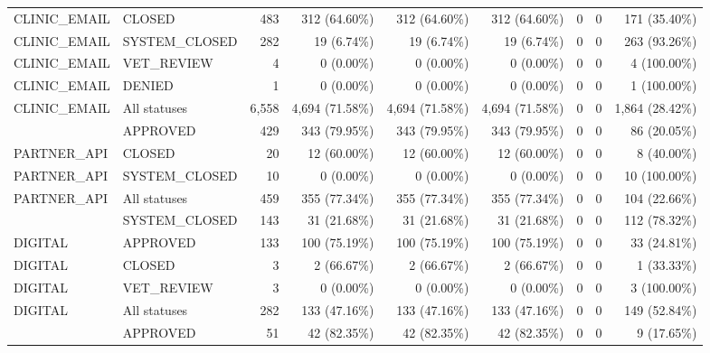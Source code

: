 \begin{longtable}{@{}llrrrrrrr@{}}
{CLINIC\_EMAIL} & {CLOSED} & 483 & 312 (64.60\%) & 312 (64.60\%) & 312 (64.60\%) & 0 & 0 & 171 (35.40\%) \\

{CLINIC\_EMAIL} & {SYSTEM\_CLOSED} & 282 & 19 (6.74\%) & 19 (6.74\%) & 19 (6.74\%) & 0 & 0 & 263 (93.26\%) \\

{CLINIC\_EMAIL} & {VET\_REVIEW} & 4 & 0 (0.00\%) & 0 (0.00\%) & 0 (0.00\%) & 0 & 0 & 4 (100.00\%) \\

{CLINIC\_EMAIL} & {DENIED} & 1 & 0 (0.00\%) & 0 (0.00\%) & 0 (0.00\%) & 0 & 0 & 1 (100.00\%) \\
\midrule
{CLINIC\_EMAIL} & {All statuses} & 6,558 & 4,694 (71.58\%) & 4,694 (71.58\%) & 4,694 (71.58\%) & 0 & 0 & 1,864 (28.42\%) \\
\addlinespace[2pt]
{PARTNER\_API} & {APPROVED} & 429 & 343 (79.95\%) & 343 (79.95\%) & 343 (79.95\%) & 0 & 0 & 86 (20.05\%) \\

{PARTNER\_API} & {CLOSED} & 20 & 12 (60.00\%) & 12 (60.00\%) & 12 (60.00\%) & 0 & 0 & 8 (40.00\%) \\

{PARTNER\_API} & {SYSTEM\_CLOSED} & 10 & 0 (0.00\%) & 0 (0.00\%) & 0 (0.00\%) & 0 & 0 & 10 (100.00\%) \\
\midrule
{PARTNER\_API} & {All statuses} & 459 & 355 (77.34\%) & 355 (77.34\%) & 355 (77.34\%) & 0 & 0 & 104 (22.66\%) \\
\addlinespace[2pt]
{DIGITAL} & {SYSTEM\_CLOSED} & 143 & 31 (21.68\%) & 31 (21.68\%) & 31 (21.68\%) & 0 & 0 & 112 (78.32\%) \\

{DIGITAL} & {APPROVED} & 133 & 100 (75.19\%) & 100 (75.19\%) & 100 (75.19\%) & 0 & 0 & 33 (24.81\%) \\

{DIGITAL} & {CLOSED} & 3 & 2 (66.67\%) & 2 (66.67\%) & 2 (66.67\%) & 0 & 0 & 1 (33.33\%) \\

{DIGITAL} & {VET\_REVIEW} & 3 & 0 (0.00\%) & 0 (0.00\%) & 0 (0.00\%) & 0 & 0 & 3 (100.00\%) \\
\midrule
{DIGITAL} & {All statuses} & 282 & 133 (47.16\%) & 133 (47.16\%) & 133 (47.16\%) & 0 & 0 & 149 (52.84\%) \\
\addlinespace[2pt]
{CVC} & {APPROVED} & 51 & 42 (82.35\%) & 42 (82.35\%) & 42 (82.35\%) & 0 & 0 & 9 (17.65\%) \\


\end{longtable}
